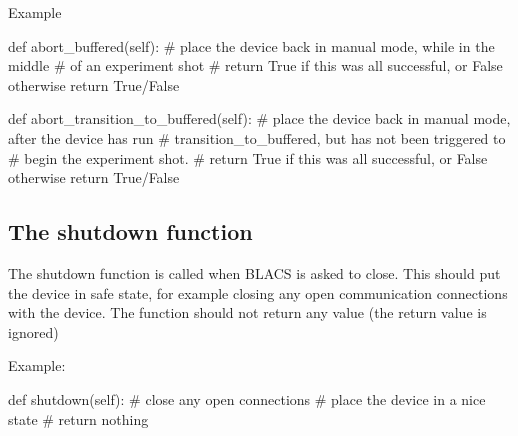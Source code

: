 \documentclass[12pt]{article}
\begin{document}
Example
\begin{python}
    def abort_buffered(self):
        # place the device back in manual mode, while in the middle
        #       of an experiment shot
        # return True if this was all successful, or False otherwise
        return True/False
		
    def abort_transition_to_buffered(self):
        # place the device back in manual mode, after the device has run
        #       transition_to_buffered, but has not been triggered to 
        #       begin the experiment shot.
        # return True if this was all successful, or False otherwise
        return True/False		
\end{python}


\subsection{The shutdown function}
The shutdown function is called when BLACS is asked to close.
This should put the device in safe state, for example closing any open communication connections with the device.
The function should not return any value (the return value is ignored)

Example:
\begin{python}
    def shutdown(self):
        # close any open connections
        # place the device in a nice state
        # return nothing
\end{python}
\end{document}
